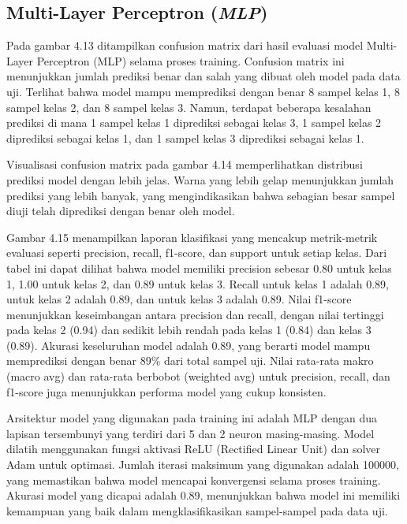 \subsection{Multi-Layer Perceptron (\emph{MLP})}
\label{sec:evalSigmoidKernel}

Pada gambar 4.13 ditampilkan confusion matrix dari hasil evaluasi model Multi-Layer Perceptron (MLP) selama proses training. Confusion matrix ini menunjukkan jumlah prediksi benar dan salah yang dibuat oleh model pada data uji. Terlihat bahwa model mampu memprediksi dengan benar 8 sampel kelas 1, 8 sampel kelas 2, dan 8 sampel kelas 3. Namun, terdapat beberapa kesalahan prediksi di mana 1 sampel kelas 1 diprediksi sebagai kelas 3, 1 sampel kelas 2 diprediksi sebagai kelas 1, dan 1 sampel kelas 3 diprediksi sebagai kelas 1.

Visualisasi confusion matrix pada gambar 4.14 memperlihatkan distribusi prediksi model dengan lebih jelas. Warna yang lebih gelap menunjukkan jumlah prediksi yang lebih banyak, yang mengindikasikan bahwa sebagian besar sampel diuji telah diprediksi dengan benar oleh model.

Gambar 4.15 menampilkan laporan klasifikasi yang mencakup metrik-metrik evaluasi seperti precision, recall, f1-score, dan support untuk setiap kelas. Dari tabel ini dapat dilihat bahwa model memiliki precision sebesar 0.80 untuk kelas 1, 1.00 untuk kelas 2, dan 0.89 untuk kelas 3. Recall untuk kelas 1 adalah 0.89, untuk kelas 2 adalah 0.89, dan untuk kelas 3 adalah 0.89. Nilai f1-score menunjukkan keseimbangan antara precision dan recall, dengan nilai tertinggi pada kelas 2 (0.94) dan sedikit lebih rendah pada kelas 1 (0.84) dan kelas 3 (0.89). Akurasi keseluruhan model adalah 0.89, yang berarti model mampu memprediksi dengan benar 89\% dari total sampel uji. Nilai rata-rata makro (macro avg) dan rata-rata berbobot (weighted avg) untuk precision, recall, dan f1-score juga menunjukkan performa model yang cukup konsisten.

Arsitektur model yang digunakan pada training ini adalah MLP dengan dua lapisan tersembunyi yang terdiri dari 5 dan 2 neuron masing-masing. Model dilatih menggunakan fungsi aktivasi ReLU (Rectified Linear Unit) dan solver Adam untuk optimasi. Jumlah iterasi maksimum yang digunakan adalah 100000, yang memastikan bahwa model mencapai konvergensi selama proses training. Akurasi model yang dicapai adalah 0.89, menunjukkan bahwa model ini memiliki kemampuan yang baik dalam mengklasifikasikan sampel-sampel pada data uji.

